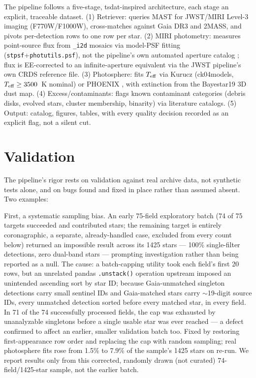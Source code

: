 \documentclass[RNAAS]{aastex7}
\begin{document}
The pipeline follows a five-stage, tsdat-inspired architecture, each
stage an explicit, traceable dataset. (1) Retriever: queries MAST for
JWST/MIRI Level-3 imaging (F770W/F1000W), cross-matches against Gaia
DR3 and 2MASS, and pivots per-detection rows to one row per star. (2)
MIRI photometry: measures point-source flux from \texttt{\_i2d}
mosaics via model-PSF fitting (\texttt{stpsf}+\texttt{photutils.psf}),
not the pipeline's own automated aperture catalog
\citep[underperforms for high-precision point-source work;][]{Libralato2024};
flux is EE-corrected to an infinite-aperture equivalent via the JWST
pipeline's own CRDS reference file. (3) Photosphere: fits $T_{\rm eff}$
via Kurucz (ck04models, $T_{\rm eff}\geq3500$~K nominal) or PHOENIX
\citep[$T_{\rm eff}\leq4000$~K;][]{Husser2013}, with extinction from
the Bayestar19 3D dust map. (4) Excess/contaminants: flags known
contaminant categories (debris disks, evolved stars, cluster
membership, binarity) via literature catalogs. (5) Output: catalog,
figures, tables, with every quality decision recorded as an explicit
flag, not a silent cut.

\section{Validation}

The pipeline's rigor rests on validation against real archive data,
not synthetic tests alone, and on bugs found and fixed in place rather
than assumed absent. Two examples:

First, a systematic sampling bias. An early 75-field exploratory batch
(74 of 75 targets succeeded and contributed stars; the remaining
target is entirely coronagraphic, a separate, already-handled case,
excluded from every count below) returned an impossible result across
its 1425 stars --- 100\% single-filter detections, zero dual-band
stars --- prompting investigation rather than being reported as a
null. The cause: a batch-capping utility took each field's first 20
rows, but an unrelated pandas \texttt{.unstack()} operation upstream
imposed an unintended ascending sort by star ID; because Gaia-unmatched
singleton detections carry small sentinel IDs and Gaia-matched stars
carry $\sim$19-digit source IDs, every unmatched detection sorted
before every matched star, in every field. In 71 of the 74 successfully
processed fields, the cap was exhausted by unanalyzable singletons
before a single usable star was ever reached --- a defect confirmed to
affect an earlier, smaller validation batch too. Fixed by restoring
first-appearance row order and replacing the cap with random sampling;
real photosphere fits rose from 1.5\% to 7.9\% of the sample's 1425
stars on re-run. We report results only from this corrected, randomly
drawn (not curated) 74-field/1425-star sample, not the earlier batch.
\end{document}
